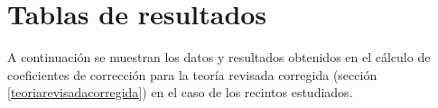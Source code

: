 



\chapter{Tablas de resultados}
\label{tablascompletas}
A continuación se muestran los datos y resultados obtenidos en el cálculo de coeficientes de corrección para la teoría revisada corregida (sección \ref{teoriarevisadacorregida}) en el caso de los recintos estudiados.

